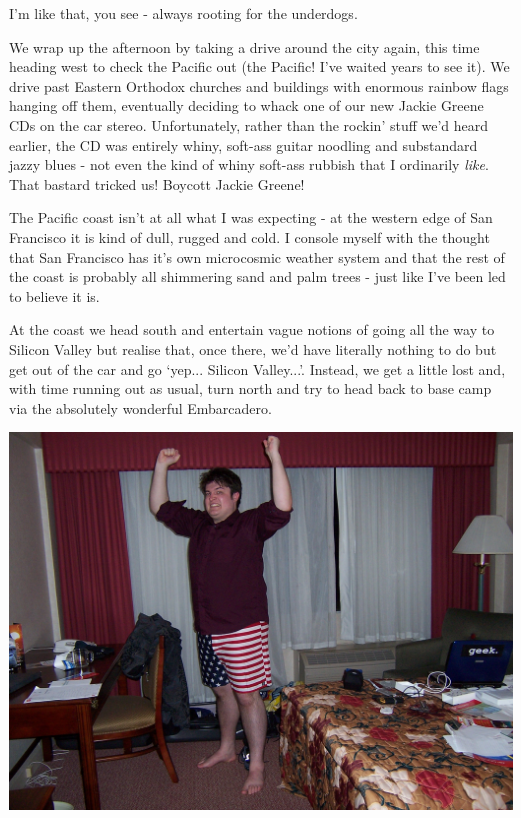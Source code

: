 \documentclass[a5paper,titlepage,11pt,draft]{book}
\begin{document}
I'm like that, you see - always rooting for the underdogs.

We wrap up the afternoon by taking a drive around the city again, this time heading west to check the Pacific out (the Pacific! I've waited years to see it).  We drive past Eastern Orthodox churches and buildings with enormous rainbow flags hanging off them, eventually deciding to whack one of our new Jackie Greene CDs on the car stereo.  Unfortunately, rather than the rockin' stuff we'd heard earlier, the CD was entirely whiny, soft-ass guitar noodling and substandard jazzy blues - not even the kind of whiny soft-ass rubbish that I ordinarily \emph{like}.  That bastard tricked us!  Boycott Jackie Greene!

The Pacific coast isn't at all what I was expecting - at the western edge of San Francisco it is kind of dull, rugged and cold.  I console myself with the thought that San Francisco has it's own microcosmic weather system and that the rest of the coast is probably all shimmering sand and palm trees - just like I've been led to believe it is.

At the coast we head south and entertain vague notions of going all the way to Silicon Valley but realise that, once there, we'd have literally nothing to do but get out of the car and go `yep... Silicon Valley...'.  Instead, we get a little lost and, with time running out as usual, turn north and try to head back to base camp via the absolutely wonderful Embarcadero.

\begin{center}\includegraphics[width=\textwidth]{gfx/100_1097}\end{center}
\end{document}
